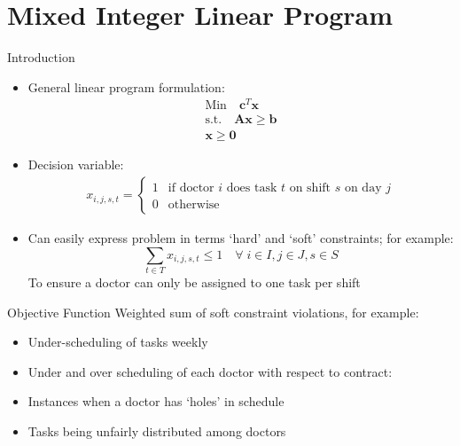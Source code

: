 \documentclass{beamer}
\begin{document}
\section{Mixed Integer Linear Program}

\begin{frame}{Introduction}
    \begin{itemize}
        \item General linear program formulation:
            \begin{equation*}
                \begin{aligned}
                    \text{Min} \quad \mathbf{c}^T \mathbf{x} \\
                    \text{s.t.} \quad
                    \mathbf{A}\mathbf{x} \geq \mathbf{b} \\
                    \mathbf{x \geq 0}
                \end{aligned}
            \end{equation*}
        \item Decision variable:
            \begin{equation*}\begin{gathered}
                x_{i,j,s,t} = 
                \begin{cases}
                    1 & \text{if doctor $i$ does task $t$ on shift $s$ on day $j$} \\
                    0 & \text{otherwise}
                \end{cases}
            \end{gathered}\end{equation*}
        \item Can easily express problem in terms `hard' and `soft' constraints; for example:
            \begin{equation*}
                \sum_{t \in T} x_{i,j,s,t} \leq 1 \quad \forall\; i \in I, j \in J, s \in S
            \end{equation*}
            To ensure a doctor can only be assigned to one task per shift
    \end{itemize}
\end{frame}

\begin{frame}{Objective Function}
    Weighted sum of soft constraint violations, for example:
    \begin{itemize}
        \item Under-scheduling of tasks weekly
        \item Under and over scheduling of each doctor with respect to contract:
        \item Instances when a doctor has `holes' in schedule
        \item Tasks being unfairly distributed among doctors
    \end{itemize}
\end{frame}
\end{document}
